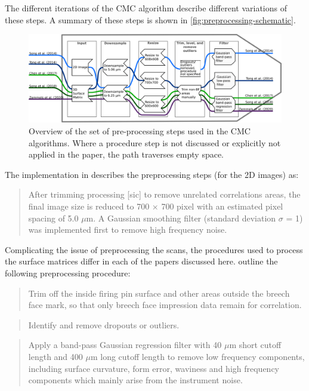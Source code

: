 The different iterations of the CMC algorithm describe different
variations of these steps. A summary of these steps is shown in
\autoref{fig:preprocessing-schematic}.

\begin{figure}
\includegraphics[width=\linewidth]{images/preprocessing_flow.png}
\caption{Overview of the set of pre-processing steps used in the CMC algorithms. Where a procedure step is not discussed or explicitly not applied in the paper, the path traverses empty space.}\label{fig:preprocessing-schematic}
\end{figure}

The implementation in \citet{tong_fired_2014} describes the
preprocessing steps (for the 2D images) as:

\begin{quote}
After trimming processing {[}sic{]} to remove unrelated correlations
areas, the final image size is reduced to 700 × 700 pixel with an
estimated pixel spacing of 5.0 \(\mu\)m. A Gaussian smoothing filter
(standard deviation \(\sigma\) = 1) was implemented first to remove high
frequency noise.
\end{quote}

Complicating the issue of preprocessing the scans, the procedures used
to process the surface matrices differ in each of the papers discussed
here. \citet{song_3d_2014} outline the following preprocessing
procedure:

\begin{quote}
Trim off the inside firing pin surface and other areas outside the
breech face mark, so that only breech face impression data remain for
correlation.
\end{quote}

\begin{quote}
Identify and remove dropouts or outliers.
\end{quote}

\begin{quote}
Apply a band-pass Gaussian regression filter with 40 \(\mu\)m short
cutoff length and 400 \(\mu\)m long cutoff length to remove low
frequency components, including surface curvature, form error, waviness
and high frequency components which mainly arise from the instrument
noise.
\end{quote}

